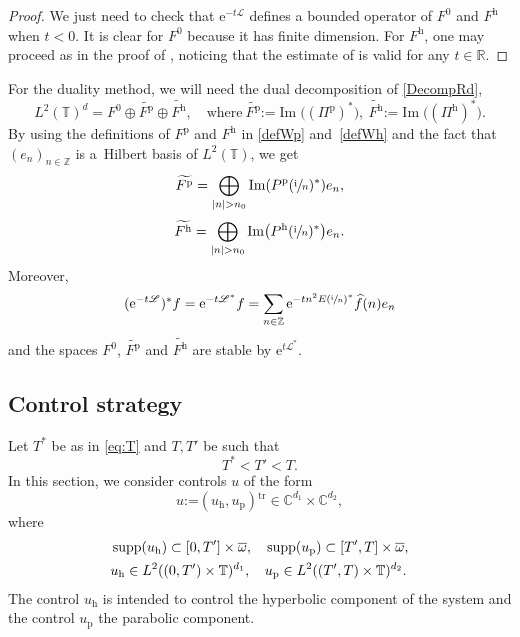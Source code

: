 \documentclass[JEP,XML,SOM,Unicode,NoEqCountersInSection]{cedram}
\let\mathcal\mathscr
\theoremstyle{plain}
\theoremstyle{definition}
\theoremstyle{remark}
\DeclareMathOperator{\Ima}{Im}
\DeclareMathOperator{\Supp}{supp}
\newcommand{\set}{\mathbb}
\newcommand{\Z}{\set{Z}}
\newcommand{\R}{} %
\renewcommand{\R}{\set{R}}
\renewcommand{\C}{\set{C}}
\newcommand{\T}{\set{T}}
\newcommand{\Tr}[1]{{#1}{}^{\mathrm{tr}}}
\newcommand{\coloneqq}{\mathrel{\mathord{:}\mathord=}}
\newcommand{\h}{{\mathrm h}}
\newcommand{\p}{{\mathrm p}}
\newcommand{\eu}{\mathrm e}
\newcommand{\iu}{\mathrm i}
\let\originalleft\left
\let\originalright\right
\renewcommand{\left}{\mathopen{}\mathclose\bgroup\originalleft}
\renewcommand{\right}{\aftergroup\egroup\originalright}
\begin{document}
\begin{proof}
We just need to check that $\eu^{-t\mathcal{L}}$ defines a bounded operator of $F^0$ and $F^\h$ when $t<0$. It is clear for $F^0$ because it has finite dimension. For $F^\h$, one may proceed as in the proof of , noticing that the estimate of  is valid for any $t\in\R$.
\end{proof}

For the duality method, we will need the dual decomposition of \eqref{DecompRd}, \ie
\begin{equation}
\label{duadecomp}
L^2(\T)^{d} = F^0 \oplus \widetilde{F^\p} \oplus \widetilde{F^\h},\quad
\text{where}\ \widetilde{F^\p} \coloneqq \Ima\big((\Pi^{\p})^{*}\big),\ \widetilde{F^\h} \coloneqq \Ima \bigl((\Pi^{\h})^{*} \bigr).
\end{equation}
By using the definitions of $F^\p$ and $F^\h$ in \eqref{defWp} and~\eqref{defWh} and the fact that $(e_n)_{n \in \Z}$ is a~Hilbert basis of $L^2(\T)$, we get
\begin{equation}
\label{defWptilde}
\widetilde{F^{\p}} =\bigoplus\limits_{|n| > n_0} \Ima\left(P^\p(\sfrac{\iu}{n})^\ast\right) e_n,
\end{equation}
\begin{equation}
\label{defWhtilde}
\widetilde{F^{\h}} =\bigoplus\limits_{|n| > n_0} \Ima\left(P^\h(\sfrac{\iu}{n})^\ast\right) e_n.
\end{equation}
Moreover,
\begin{equation}\label{eq:adj_semigroup}
(\eu^{-t\mathcal L})^\ast f = \eu^{-t\mathcal L^\ast} f= \sum_{n\in\set Z} \eu^{-tn^2 E\left(\sfrac{\iu}{n}\right)^\ast} \widehat{f}(n) e_n
\end{equation}
and the spaces $F^0$, $\widetilde{F^\p}$ and $\widetilde{F^\h}$ are stable by $\eu^{t\mathcal L^\ast}$.

\subsection{Control strategy} \label{subsec:CS}

Let $T^{*}$ be as in \eqref{eq:T} and $T, T'$ be such that
\begin{equation}
T^\ast < T' < T.
\label{defTT'}
\end{equation}
In this section, we consider controls $u$ of the form
\begin{equation}
\label{DecompH}
u \coloneqq \Tr{(u_{\h}, u_{\p})} \in \C^{d_1} \times \C^{d_2},
\end{equation}
where
\begin{align}
&\Supp(u_{\h}) \subset [0,T']\times\overline \omega,&& \Supp(u_{\p}) \subset [T',T] \times \overline \omega,
\label{suppHhHp}
\\\notag
&u_{\h} \in L^2((0,T')\times\T)^{d_1}, && u_{\p} \in L^2((T',T)\times\T)^{d_2}.
\end{align}
The control $u_{\h}$ is intended to control the hyperbolic component of the system and the control $u_{\p}$ the parabolic component.
\end{document}
